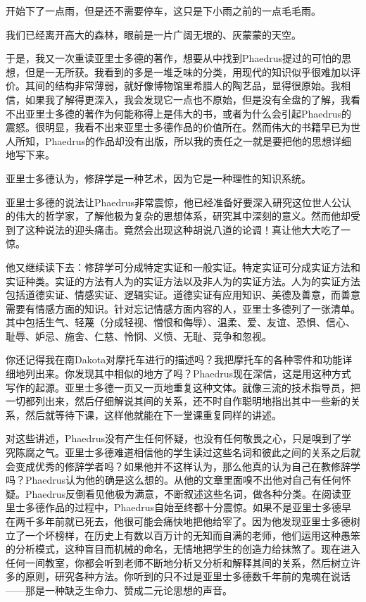 \documentclass[UTF8]{article}
\begin{document}
\par 开始下了一点雨，但是还不需要停车，这只是下小雨之前的一点毛毛雨。
\par 我们已经离开高大的森林，眼前是一片广阔无垠的、灰蒙蒙的天空。
\par 于是，我又一次重读亚里士多德的著作，想要从中找到Phaedrus提过的可怕的思想，但是一无所获。我看到的多是一堆乏味的分类，用现代的知识似乎很难加以评价。其间的结构非常薄弱，就好像博物馆里希腊人的陶艺品，显得很原始。我相信，如果我了解得更深入，我会发现它一点也不原始，但是没有全盘的了解，我看不出亚里士多德的著作为何能称得上是伟大的书，或者为什么会引起Phaedrus的震怒。很明显，我看不出来亚里士多德作品的价值所在。然而伟大的书籍早已为世人所知，Phaedrus的作品却没有出版，所以我的责任之一就是要把他的思想详细地写下来。
\par 亚里士多德认为，修辞学是一种艺术，因为它是一种理性的知识系统。
\par 亚里士多德的说法让Phaedrus非常震惊，他已经准备好要深入研究这位世人公认的伟大的哲学家，了解他极为复杂的思想体系，研究其中深刻的意义。然而他却受到了这种说法的迎头痛击。竟然会出现这种胡说八道的论调！真让他大大吃了一惊。
\par 他又继续读下去：修辞学可分成特定实证和一般实证。特定实证可分成实证方法和实证种类。实证的方法有人为的实证方法以及非人为的实证方法。人为的实证方法包括道德实证、情感实证、逻辑实证。道德实证有应用知识、美德及善意，而善意需要有情感方面的知识。针对忘记情感方面内容的人，亚里士多德列了一张清单。其中包括生气、轻蔑（分成轻视、憎恨和侮辱）、温柔、爱、友谊、恐惧、信心、耻辱、妒忌、施舍、仁慈、怜悯、义愤、无耻、竞争和忽视。
\par 你还记得我在南Dakota对摩托车进行的描述吗？我把摩托车的各种零件和功能详细地列出来。你发现其中相似的地方了吗？Phaedrus现在深信，这是用这种方式写作的起源。亚里士多德一页又一页地重复这种文体。就像三流的技术指导员，把一切都列出来，然后仔细解说其间的关系，还不时自作聪明地指出其中一些新的关系，然后就等待下课，这样他就能在下一堂课重复同样的讲述。
\par 对这些讲述，Phaedrus没有产生任何怀疑，也没有任何敬畏之心，只是嗅到了学究陈腐之气。亚里士多德难道相信他的学生读过这些名词和彼此之间的关系之后就会变成优秀的修辞学者吗？如果他并不这样认为，那么他真的认为自己在教修辞学吗？Phaedrus认为他的确是这么想的。从他的文章里面嗅不出他对自己有任何怀疑。Phaedrus反倒看见他极为满意，不断叙述这些名词，做各种分类。在阅读亚里士多德作品的过程中，Phaedrus自始至终都十分震惊。如果不是亚里士多德早在两千多年前就已死去，他很可能会痛快地把他给宰了。因为他发现亚里士多德树立了一个坏榜样，在历史上有数以百万计的无知而自满的老师，他们运用这种愚笨的分析模式，这种盲目而机械的命名，无情地把学生的创造力给抹煞了。现在进入任何一间教室，你都会听到老师不断地分析又分析和解释其间的关系，然后树立许多的原则，研究各种方法。你听到的只不过是亚里士多德数千年前的鬼魂在说话——那是一种缺乏生命力、赞成二元论思想的声音。
\end{document}
